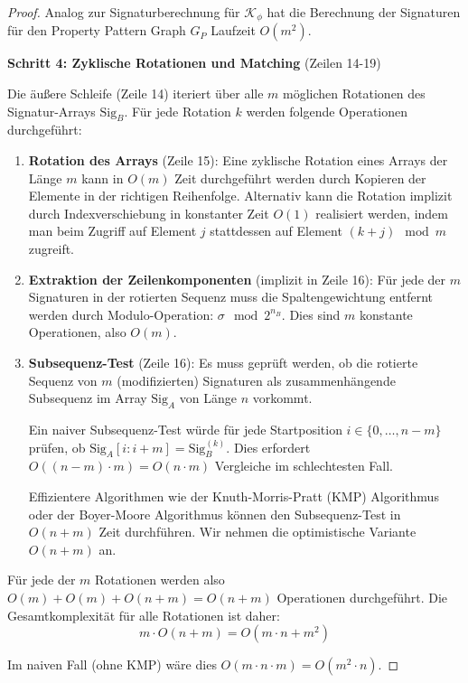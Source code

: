 ﻿\documentclass[a4paper,12pt]{article}
\theoremstyle{definition}
\begin{document}
\begin{proof}
Analog zur Signaturberechnung für $\mathcal{K}_{\phi}$ hat die Berechnung der Signaturen für den Property Pattern Graph $G_P$ Laufzeit $O(m^2)$.

\textbf{Schritt 4: Zyklische Rotationen und Matching} (Zeilen 14-19)

Die äußere Schleife (Zeile 14) iteriert über alle $m$ möglichen Rotationen des Signatur-Arrays $\text{Sig}_B$. Für jede Rotation $k$ werden folgende Operationen durchgeführt:

\begin{enumerate}
\item \textbf{Rotation des Arrays} (Zeile 15): Eine zyklische Rotation eines Arrays der Länge $m$ kann in $O(m)$ Zeit durchgeführt werden durch Kopieren der Elemente in der richtigen Reihenfolge. Alternativ kann die Rotation implizit durch Indexverschiebung in konstanter Zeit $O(1)$ realisiert werden, indem man beim Zugriff auf Element $j$ stattdessen auf Element $(k+j) \mod m$ zugreift.

\item \textbf{Extraktion der Zeilenkomponenten} (implizit in Zeile 16): Für jede der $m$ Signaturen in der rotierten Sequenz muss die Spaltengewichtung entfernt werden durch Modulo-Operation: $\sigma \mod 2^{n_B}$. Dies sind $m$ konstante Operationen, also $O(m)$.

\item \textbf{Subsequenz-Test} (Zeile 16): Es muss geprüft werden, ob die rotierte Sequenz von $m$ (modifizierten) Signaturen als zusammenhängende Subsequenz im Array $\text{Sig}_A$ von Länge $n$ vorkommt.

Ein naiver Subsequenz-Test würde für jede Startposition $i \in \{0, \ldots, n-m\}$ prüfen, ob $\text{Sig}_A[i:i+m] = \text{Sig}_B^{(k)}$. Dies erfordert $O((n-m) \cdot m) = O(n \cdot m)$ Vergleiche im schlechtesten Fall.

Effizientere Algorithmen wie der Knuth-Morris-Pratt (KMP) Algorithmus oder der Boyer-Moore Algorithmus können den Subsequenz-Test in $O(n + m)$ Zeit durchführen. Wir nehmen die optimistische Variante $O(n + m)$ an.
\end{enumerate}

Für jede der $m$ Rotationen werden also $O(m) + O(m) + O(n+m) = O(n+m)$ Operationen durchgeführt. Die Gesamtkomplexität für alle Rotationen ist daher:
\begin{equation}
m \cdot O(n+m) = O(m \cdot n + m^2)
\end{equation}

Im naiven Fall (ohne KMP) wäre dies $O(m \cdot n \cdot m) = O(m^2 \cdot n)$.


\end{proof}
\end{document}
